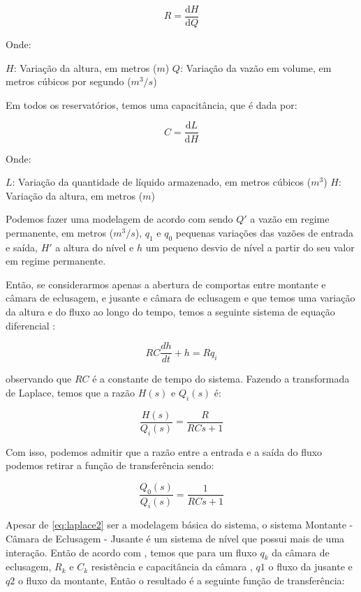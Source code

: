 \begin{equation} \label{eq:resistencia_teoria1}
 R=\frac{\mathrm{d} H }{\mathrm{d} Q}
\end{equation}

Onde:

    $H$: Variação da altura, em metros ($m$)
    $Q$: Variação da vazão em volume, em metros cúbicos por segundo ($m^3/s$)

Em todos os reservatórios, temos uma capacitância, que é dada por:

\begin{equation} \label{eq:capacitancia_teoria1}
 C=\frac{\mathrm{d} L }{\mathrm{d} H}
\end{equation}

Onde:

    $L$: Variação da quantidade de líquido armazenado, em metros cúbicos ($m^3$)
    $H$: Variação da altura, em metros ($m$)

Podemos fazer uma modelagem de acordo com \cite{Ogata} sendo $Q'$ a vazão em regime permanente, em metros ($m^3/s$), $q_1$ e $q_0$ pequenas variações das vazões de entrada e saída, $H'$ a altura do nível e $h$ um pequeno desvio de nível a partir do seu valor em regime permanente.

Então, se considerarmos apenas a abertura de comportas entre montante e câmara de eclusagem, e jusante e câmara de eclusagem e que temos uma variação da altura e do fluxo ao longo do tempo, temos a seguinte sistema de equação diferencial \cite{Ogata}:

\begin{equation} \label{eq:eqdif1}
 RC\frac{dh}{dt}+h=Rq_i
\end{equation}

observando que $RC$ é a constante de tempo do sistema. Fazendo a transformada de Laplace, temos que a razão $H(s)$ e $Q_i(s)$ é:

\begin{equation} \label{eq:laplace1}
 \frac{H(s)}{Q_i(s)}=\frac{R}{RCs+1}
\end{equation}

Com isso, podemos admitir que a razão entre a entrada e a saída do fluxo podemos retirar a função de transferência sendo:

\begin{equation} \label{eq:laplace2}
 \frac{Q_0(s)}{Q_i(s)}=\frac{1}{RCs+1}
\end{equation}

Apesar de  \ref{eq:laplace2} ser a modelagem básica do sistema, o sistema Montante - Câmara de Eclusagem - Jusante é um sistema de nível que possui mais de uma interação. Então de acordo com \cite{Ogata}, temos que para um fluxo $q_k$ da câmara de eclusagem, $R_k$ e $C_k$ resistência e capacitância da câmara , $q1$ o fluxo da jusante e $q2$ o fluxo da montante, Então o resultado é a seguinte função de transferência:

